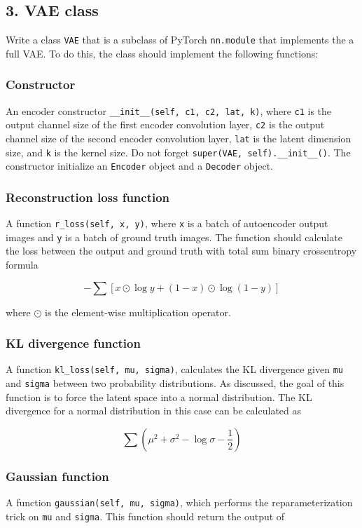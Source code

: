\documentclass{article}
\begin{document}
\subsection*{3. VAE class}
Write a class \texttt{VAE} that is a subclass of PyTorch \texttt{nn.module} that implements the a full VAE. To do this, the class should implement the following functions:
\subsubsection*{Constructor}
An encoder constructor \texttt{\_\_init\_\_(self, c1, c2, lat, k)}, where \texttt{c1} is the output channel size of the first encoder convolution layer, \texttt{c2} is the output channel size of the second encoder convolution layer, \texttt{lat} is the latent dimension size, and \texttt{k} is the kernel size. Do not forget \texttt{super(VAE, self).\_\_init\_\_()}. The constructor initialize an \texttt{Encoder} object and a \texttt{Decoder} object.

\subsubsection*{Reconstruction loss function}
A function \texttt{r\_loss(self, x, y)}, where \texttt{x} is a batch of autoencoder output images and  \texttt{y} is a batch of ground truth images. The function should calculate the loss between the output and ground truth with total sum binary crossentropy formula

\[-\sum[x \odot \log y + (1 - x) \odot \log(1 - y )]\] 

\noindent
where $\odot$ is the element-wise multiplication operator.

\subsubsection*{KL divergence function}
A function \texttt{kl\_loss(self, mu, sigma)}, calculates the KL divergence given \texttt{mu} and \texttt{sigma} between two probability distributions. As discussed, the goal of this function is to force the latent space into a normal distribution. The KL divergence for a normal distribution in this case can be calculated as

\[\sum (\mu ^ 2 + \sigma ^ 2 - \log\sigma - \frac{1}{2})\]

\subsubsection*{Gaussian function}
A function \texttt{gaussian(self, mu, sigma)}, which performs the reparameterization trick on \texttt{mu} and \texttt{sigma}. This function should return the output of 
\end{document}
